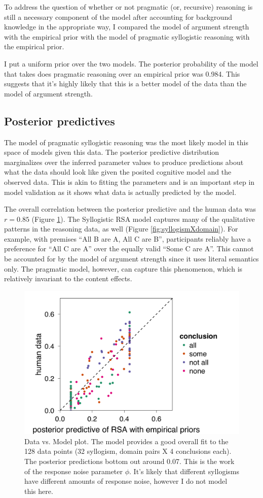 \documentclass{llncs} %
\begin{document}
To address the question of whether or not pragmatic (or, recursive) reasoning is still a necessary component of the model after accounting for background knowledge in the appropriate way, I compared the model of argument strength with the empirical prior with the model of pragmatic syllogistic reasoning with the empirical prior. 

I put a uniform prior over the two models. The posterior probability of the model that takes does pragmatic reasoning over an empirical prior was 0.984. This suggests that it's highly likely that this is a better model of the data than the model of argument strength. 

\subsection{Posterior predictives}

The model of pragmatic syllogistic reasoning was the most likely model in this space of models given this data. The posterior predictive distribution marginalizes over the inferred parameter values to produce predictions about what the data should look like given the posited cognitive model and the observed data. This is akin to fitting the parameters and is an important step in model validation as it shows what data is actually predicted by the model.

The overall correlation between the posterior predictive and the human data was $r = 0.85$ (Figure \ref{fig:scatterplot}). The Syllogistic RSA model captures many of the qualitative patterns in the reasoning data, as well (Figure \ref{fig:syllogismXdomain}). For example, with premises ``All B are A, All C are B'', participants reliably have a preference for ``All C are A'' over the equally valid ``Some C are A''. This cannot be accounted for by the model of argument strength since it uses literal semantics only. The pragmatic model, however, can capture this phenomenon, which is relatively invariant to the content effects.

\begin{figure}
\centering
    \includegraphics[width=0.5\columnwidth]{figures/scatterplot}
    \caption{Data vs. Model plot. The model provides a good overall fit to the 128 data points (32 syllogism, domain pairs X 4 conclusions each). The posterior predictions bottom out around 0.07. This is the work of the response noise parameter $\phi$. It's likely that different syllogisms have different amounts of response noise, however I do not model this here.}
  \label{fig:scatterplot}
\end{figure}
\end{document}
